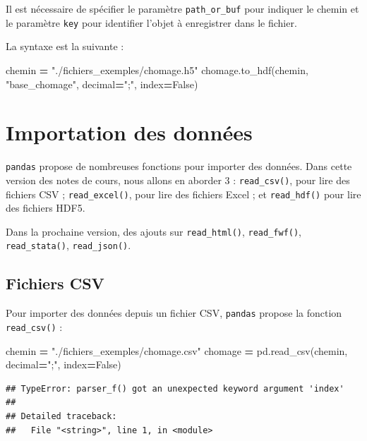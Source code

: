 \documentclass[12pt,]{book}
\newenvironment{Shaded}{\begin{snugshade}}{\end{snugshade}}
\newcommand{\StringTok}[1]{\textcolor[rgb]{0.31,0.60,0.02}{#1}}
\newcommand{\VariableTok}[1]{\textcolor[rgb]{0.00,0.00,0.00}{#1}}
\newcommand{\OperatorTok}[1]{\textcolor[rgb]{0.81,0.36,0.00}{\textbf{#1}}}
\newcommand{\NormalTok}[1]{#1}
\numberwithin{equation}{section}
\numberwithin{countremarque}{section}
\begin{document}
Il est nécessaire de spécifier le paramètre \texttt{path\_or\_buf} pour
indiquer le chemin et le paramètre \texttt{key} pour identifier l'objet
à enregistrer dans le fichier.

La syntaxe est la suivante :

\begin{Shaded}
\begin{Highlighting}[]
\NormalTok{chemin }\OperatorTok{=} \StringTok{"./fichiers_exemples/chomage.h5"}
\NormalTok{chomage.to_hdf(chemin, }\StringTok{"base_chomage"}\NormalTok{, decimal}\OperatorTok{=}\StringTok{";"}\NormalTok{, index}\OperatorTok{=}\VariableTok{False}\NormalTok{)}
\end{Highlighting}
\end{Shaded}

\section{Importation des données}\label{importation-des-donnees}

\texttt{pandas} propose de nombreuses fonctions pour importer des
données. Dans cette version des notes de cours, nous allons en aborder 3
: \texttt{read\_csv()}, pour lire des fichiers CSV ;
\texttt{read\_excel()}, pour lire des fichiers Excel ; et
\texttt{read\_hdf()} pour lire des fichiers HDF5.

Dans la prochaine version, des ajouts sur \texttt{read\_html()},
\texttt{read\_fwf()}, \texttt{read\_stata()}, \texttt{read\_json()}.

\subsection{Fichiers CSV}\label{pandas-importation-csv}

Pour importer des données depuis un fichier CSV, \texttt{pandas} propose
la fonction \texttt{read\_csv()} :

\begin{Shaded}
\begin{Highlighting}[]
\NormalTok{chemin }\OperatorTok{=} \StringTok{"./fichiers_exemples/chomage.csv"}
\NormalTok{chomage }\OperatorTok{=}\NormalTok{ pd.read_csv(chemin, decimal}\OperatorTok{=}\StringTok{";"}\NormalTok{, index}\OperatorTok{=}\VariableTok{False}\NormalTok{)}
\end{Highlighting}
\end{Shaded}

\begin{lstlisting}
## TypeError: parser_f() got an unexpected keyword argument 'index'
## 
## Detailed traceback: 
##   File "<string>", line 1, in <module>
\end{lstlisting}
\end{document}
